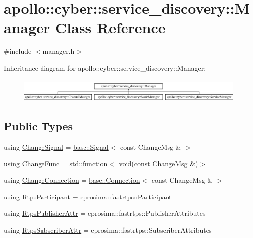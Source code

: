 \hypertarget{classapollo_1_1cyber_1_1service__discovery_1_1Manager}{\section{apollo\-:\-:cyber\-:\-:service\-\_\-discovery\-:\-:Manager Class Reference}
\label{classapollo_1_1cyber_1_1service__discovery_1_1Manager}
}


{\ttfamily \#include $<$manager.\-h$>$}

Inheritance diagram for apollo\-:\-:cyber\-:\-:service\-\_\-discovery\-:\-:Manager\-:\begin{figure}[H]
\begin{center}
\leavevmode
\includegraphics[height=1.212121cm]{classapollo_1_1cyber_1_1service__discovery_1_1Manager}
\end{center}
\end{figure}
\subsection*{Public Types}
\begin{DoxyCompactItemize}
\item 
using \hyperlink{classapollo_1_1cyber_1_1service__discovery_1_1Manager_a9730b844d88e23f65d5dcbcfca1a7d59}{Change\-Signal} = \hyperlink{classapollo_1_1cyber_1_1base_1_1Signal}{base\-::\-Signal}$<$ const Change\-Msg \& $>$
\item 
using \hyperlink{classapollo_1_1cyber_1_1service__discovery_1_1Manager_a1e08b690a5829fbabeb6d3aea5ab8320}{Change\-Func} = std\-::function$<$ void(const Change\-Msg \&)$>$
\item 
using \hyperlink{classapollo_1_1cyber_1_1service__discovery_1_1Manager_ab43fa282f6aa1b3b1180a1e416b98b68}{Change\-Connection} = \hyperlink{classapollo_1_1cyber_1_1base_1_1Connection}{base\-::\-Connection}$<$ const Change\-Msg \& $>$
\item 
using \hyperlink{classapollo_1_1cyber_1_1service__discovery_1_1Manager_a7576b9ac293ff99af06e30a971df5dce}{Rtps\-Participant} = eprosima\-::fastrtps\-::\-Participant
\item 
using \hyperlink{classapollo_1_1cyber_1_1service__discovery_1_1Manager_a1b8464bc115c49a16a0d943c7cb5ef32}{Rtps\-Publisher\-Attr} = eprosima\-::fastrtps\-::\-Publisher\-Attributes
\item 
using \hyperlink{classapollo_1_1cyber_1_1service__discovery_1_1Manager_ac16fc5e01d6d107cbb865d6d8127f622}{Rtps\-Subscriber\-Attr} = eprosima\-::fastrtps\-::\-Subscriber\-Attributes
\end{DoxyCompactItemize}
